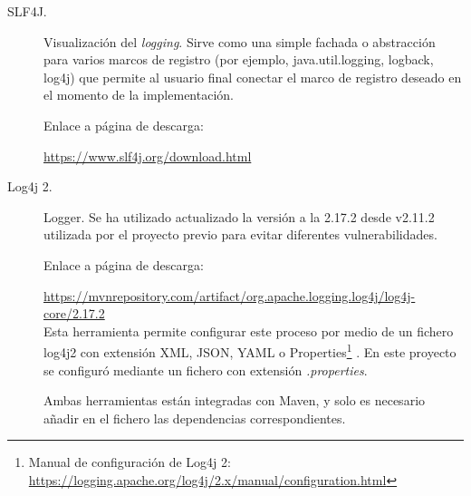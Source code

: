 \begin{description}
	\item[SLF4J.] Visualización del \textit{logging}.
	Sirve como una simple fachada o abstracción para varios marcos de registro (por ejemplo, java.util.logging, logback, log4j) que permite al usuario final conectar el marco de registro deseado en el momento de la implementación.
	
		Enlace a página de descarga:
	
		\url{https://www.slf4j.org/download.html}
	
	\item[Log4j 2.] Logger. Se ha utilizado actualizado la versión a la 2.17.2 desde v2.11.2 utilizada por el proyecto previo \cite{TFGPrevio} para evitar diferentes vulnerabilidades.
	
	 	Enlace a página de descarga:
	
	 	\url{https://mvnrepository.com/artifact/org.apache.logging.log4j/log4j-core/2.17.2}\\
		
		Esta herramienta permite configurar este proceso por medio de un fichero log4j2 con extensión XML, JSON, YAML o Properties\footnote{Manual de configuración de Log4j 2: \url{https://logging.apache.org/log4j/2.x/manual/configuration.html}} \cite{apache_apache_nodate}. En este proyecto se configuró mediante un fichero con extensión \textit{.properties}. 
		
		Ambas herramientas están integradas con Maven, y solo es necesario añadir en el fichero  las dependencias correspondientes.
	
\end{description}
